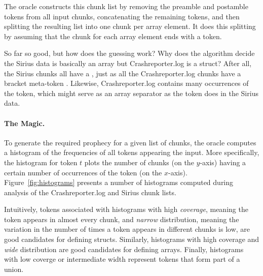 \noindent
The oracle constructs this chunk list by removing the preamble and
postamble tokens from all input chunks, concatenating the
remaining tokens, and then splitting the resulting list into one chunk
per array element. It does this splitting by assuming that the chunk
for each array element ends with a  token.  

So far so good, but how does the guessing work?  Why does the
algorithm decide the Sirius data is basically an array but 
Crashreporter.log is a struct? After all, the Sirius chunks all have
a , just as all the Crashreporter.log chunks have a bracket
meta-token \cd{[*]}. Likewise, Crashreporter.log contains many occurrences of
the  token, which might serve as
an array separator as the  token does in the Sirius data.



\paragraph*{The Magic.}
To generate the required prophecy for a given list of chunks, the
oracle computes a histogram of the frequencies of all tokens appearing
the input.  
More specifically, the histogram for token $t$
plots the number of chunks (on the $y$-axis)
having a certain number of occurrences of the token (on the $x$-axis). 
Figure~\ref{fig:histograms} presents a number of histograms computed
during analysis of the Crashreporter.log and Sirius chunk lists.

Intuitively, tokens associated 
with histograms with high {\em coverage}, meaning the token appears
in almost every chunk, and {\em narrow} distribution, meaning the variation in
the number of times a token appears in different chunks is low, are
good candidates for defining structs.  Similarly, histograms with
high coverage and {\em wide} distribution are good candidates for defining
arrays.  Finally, histograms with low coverge or intermediate width
represent tokens that form part of a union.  


